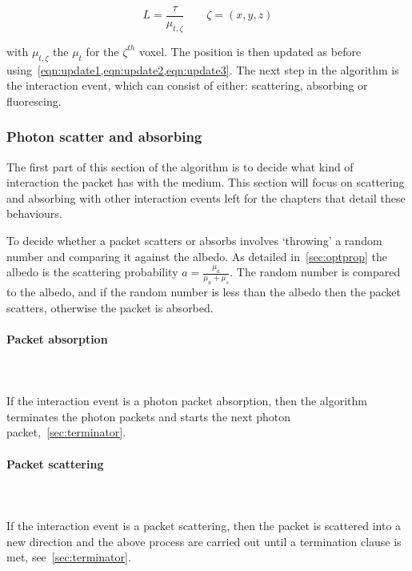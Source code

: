 \begin{equation}
L=\frac{\tau}{\mu_{t,\zeta}}\quad\quad \zeta=(x,y,z)
\end{equation}

with $\mu_{t,\zeta}$ the $\mu_t$ for the $\zeta^{th}$ voxel. The position is then updated as before using~\cref{eqn:update1,eqn:update2,eqn:update3}. The next step in the algorithm is the interaction event, which can consist of either: scattering, absorbing or fluorescing.

\subsubsection{Photon scatter and absorbing}\label{sec:photscatterabsorb}

The first part of this section of the algorithm is to decide what kind of interaction the packet has with the medium. This section will focus on scattering and absorbing with other interaction events left for the chapters that detail these behaviours.
\medskip

To decide whether a packet scatters or absorbs involves `throwing' a random number and comparing it against the albedo. As detailed in~\cref{sec:optprop} the albedo is the scattering probability $a=\tfrac{\mu_a}{\mu_a+\mu_s}$. The random number is compared to the albedo, and if the random number is less than the albedo then the packet scatters, otherwise the packet is absorbed.

\paragraph{Packet absorption}\hspace{0pt}\\
\\
If the interaction event is a photon packet absorption, then the algorithm terminates the photon packets and starts the next photon packet,~\cref{sec:terminator}.

\paragraph{Packet scattering}\hspace{0pt}\\
\\
If the interaction event is a packet scattering, then the packet is scattered into a new direction and the above process are carried out until a termination clause is met, see~\cref{sec:terminator}.

